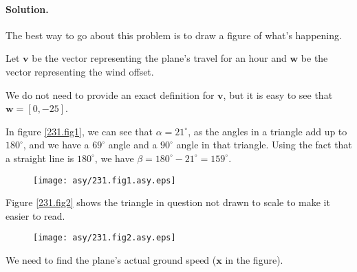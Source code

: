 

\paragraph{Solution.}


The best way to go about this problem is to draw a figure of what's happening.

Let $\mathbf{v}$ be the vector representing the plane's travel for an hour and $\mathbf{w}$ be the vector representing the wind offset.

We do not need to provide an exact definition for $\mathbf{v}$, but it is easy to see that $\mathbf{w}=\left[0,-25\right]$.

In figure \vref{231.fig1}, we can see that $\alpha=21^\circ$, as the angles in a triangle add up to $180^\circ$, and we have a $69^\circ$ angle and a $90^\circ$ angle in that triangle. Using the fact that a straight line is $180^\circ$, we have $\beta=180^\circ-21^\circ=159^\circ$.

\begin{figure}[h]\caption{}\label{231.fig1}\begin{center}\texttt{[image: asy/231.fig1.asy.eps]}\end{center}\end{figure}

Figure \vref{231.fig2} shows the triangle in question not drawn to scale to make it easier to read.

\begin{figure}[h]\caption{}\label{231.fig2}\begin{center}\texttt{[image: asy/231.fig2.asy.eps]}\end{center}\end{figure}

We need to find the plane's actual ground speed ($\mathbf{x}$ in the figure).

